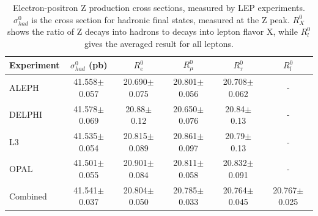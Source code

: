 \begin{table}[htbp]
  \begin{center}
    \caption[Electron-positron Z production cross sections, 
      measured by LEP experiments]
	    {Electron-positron Z production cross sections, 
	      measured by LEP experiments. 
	      $\sigma_{had}^0$ is the cross section for hadronic 
	      final states, measured at the Z peak. 
	      $R_X^0$ shows the ratio of Z decays into hadrons 
	      to decays into lepton flavor X, 
	      while $R_l^0$ gives the averaged result for all leptons.  
	    }
    \label{TableLep}
    \begin{tabular}[]{ | l | c | c | c | c | c |}
      \hline
      Experiment & $\sigma_{had}^0 $ (pb) & $R_e^0$ & $R_{\mu}^0$ & $R_{\tau}^0$ & $R_l^0$ \\ \hline \hline
      ALEPH & 41.558$\pm$0.057 & 20.690$\pm$0.075 & 20.801$\pm$0.056 & 20.708$\pm$0.062 & - \\ \hline
      DELPHI & 41.578$\pm$0.069 & 20.88$\pm$0.12 & 20.650$\pm$0.076 & 20.84$\pm$0.13 & - \\ \hline
      L3 & 41.535$\pm$0.054 & 20.815$\pm$0.089 & 20.861$\pm$0.097 & 20.79$\pm$0.13 & - \\ \hline
      OPAL & 41.501$\pm$0.055 & 20.901$\pm$0.084 & 20.811$\pm$0.058 & 20.832$\pm$0.091 & - \\ \hline
      Combined & 41.541$\pm$0.037 & 20.804$\pm$0.050 & 20.785$\pm$0.033 & 20.764$\pm$0.045 & 20.767$\pm$0.025\\ \hline
    \end{tabular}
  \end{center}
\end{table}








